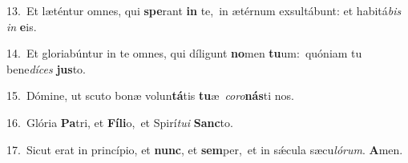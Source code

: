 {\numbfont\textcolor{\numbcolor}{13.}}~Et læténtur omnes, qui \textbf{spe}\-rant \textbf{in} te,~\star in ætérnum exsultábunt: et habitá\textit{bis} \textit{in} \textbf{e}\-is.\par
{\numbfont\textcolor{\numbcolor}{14.}}~Et gloriabúntur in te omnes, qui díligunt \textbf{no}\-men \textbf{tu}\-um:~\star quóniam tu bene\-\textit{dí}\-\textit{ces} \textbf{jus}\-to.\par
{\numbfont\textcolor{\numbcolor}{15.}}~Dómine, ut scuto bonæ volun\-\textbf{tá}\-tis \textbf{tu}\-æ~\star \textit{co}\-\textit{ro}\textbf{nás}ti nos.\par
{\numbfont\textcolor{\numbcolor}{16.}}~Glória \textbf{Pa}\-tri, et \textbf{Fí}\-\textbf{li}o,~\star et Spirí\-\textit{tu}\-\textit{i} \textbf{Sanc}\-to.\par
{\numbfont\textcolor{\numbcolor}{17.}}~Sicut erat in princípio, et \textbf{nunc}\-, et \textbf{sem}\-per,~\star et in sǽcula sæcu\-\textit{ló}\-\textit{rum}. \textbf{A}\-men.\par
